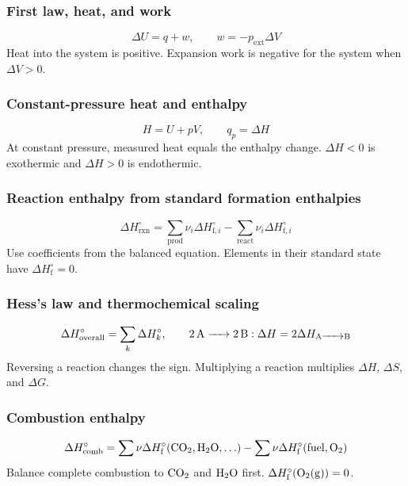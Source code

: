 \subsubsection{First law, heat, and work}
\begin{equation}
\Delta U=q+w, \qquad w=-p_{\mathrm{ext}}\Delta V
\label{eq:thermo:first-law-work}
\end{equation}
Heat into the system is positive. Expansion work is negative for the system when \(\Delta V>0\).

\subsubsection{Constant-pressure heat and enthalpy}
\begin{equation}
H=U+pV, \qquad q_p=\Delta H
\label{eq:thermo:enthalpy-constant-pressure}
\end{equation}
At constant pressure, measured heat equals the enthalpy change. \(\Delta H<0\) is exothermic and \(\Delta H>0\) is endothermic.

\subsubsection{Reaction enthalpy from standard formation enthalpies}
\begin{equation}
\boxed{\Delta H^\circ_{\mathrm{rxn}}=
\sum_{\mathrm{prod}}\nu_i\Delta H^\circ_{\mathrm f,i}
-\sum_{\mathrm{react}}\nu_i\Delta H^\circ_{\mathrm f,i}}
\label{eq:thermo:reaction-enthalpy-formation}
\end{equation}
Use coefficients from the balanced equation. Elements in their standard state have \(\Delta H^\circ_{\mathrm f}=0\).

\subsubsection{Hess's law and thermochemical scaling}
\begin{equation}
\Delta H^\circ_{\mathrm{overall}}=\sum_k \Delta H^\circ_k, \qquad
\ce{2A -> 2B}: \Delta H=2\Delta H_{\ce{A -> B}}
\label{eq:thermo:hess-scaling}
\end{equation}
Reversing a reaction changes the sign. Multiplying a reaction multiplies \(\Delta H\), \(\Delta S\), and \(\Delta G\).

\subsubsection{Combustion enthalpy}
\begin{equation}
\Delta H^\circ_{\mathrm{comb}}
=\sum\nu\Delta H^\circ_{\mathrm f}(\ce{CO2},\ce{H2O},\ldots)
-\sum\nu\Delta H^\circ_{\mathrm f}(\text{fuel},\ce{O2})
\label{eq:thermo:combustion-enthalpy}
\end{equation}
Balance complete combustion to \(\ce{CO2}\) and \(\ce{H2O}\) first. \(\Delta H^\circ_{\mathrm f}(\ce{O2(g)})=0\).

